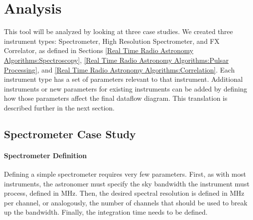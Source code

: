 \chapter{Analysis} \label{Analysis}

This tool will be analyzed by looking at three case studies. 
We created three instrument types: Spectrometer, High Resolution Spectrometer, and FX Correlator, as defined in Sections \ref{Real Time Radio Astronomy Algorithms:Spectroscopy}, \ref{Real Time Radio Astronomy Algorithms:Pulsar Processing}, and \ref{Real Time Radio Astronomy Algorithms:Correlation}. 
Each instrument type has a set of parameters relevant to that instrument. 
Additional instruments or new parameters for existing instruments can be added by defining how those parameters affect the final dataflow diagram. 
This translation is described further in the next section.









\section{Spectrometer Case Study}

\subsubsection{Spectrometer Definition}
Defining a simple spectrometer requires very few parameters. 
First, as with most instruments, the astronomer must specify the sky bandwidth the instrument must process, defined in MHz.
Then, the desired spectral resolution is defined in MHz per channel, or analogously, the number of channels that should be used to break up the bandwidth.
Finally, the integration time needs to be defined.


